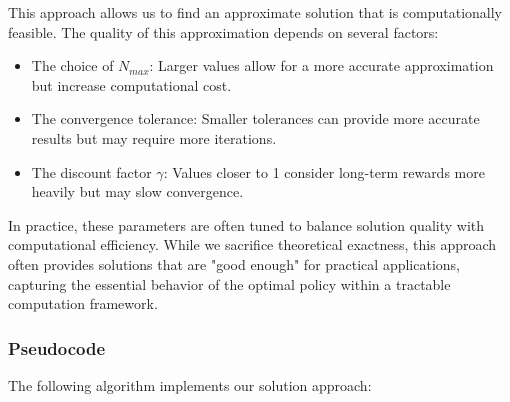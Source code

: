 \documentclass[11pt]{article}
\begin{document}
This approach allows us to find an approximate solution that is computationally feasible. The quality of this approximation depends on several factors:

\begin{itemize}
    \item The choice of $N_{max}$: Larger values allow for a more accurate approximation but increase computational cost.
    \item The convergence tolerance: Smaller tolerances can provide more accurate results but may require more iterations.
    \item The discount factor $\gamma$: Values closer to 1 consider long-term rewards more heavily but may slow convergence.
\end{itemize}

In practice, these parameters are often tuned to balance solution quality with computational efficiency. While we sacrifice theoretical exactness, this approach often provides solutions that are "good enough" for practical applications, capturing the essential behavior of the optimal policy within a tractable computation framework.

\subsubsection*{Pseudocode}

The following algorithm implements our solution approach:
\end{document}
